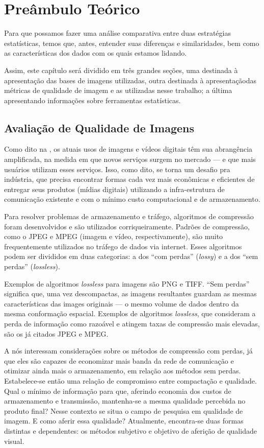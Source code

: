 \chapter{Preâmbulo Teórico}

Para que possamos fazer uma análise comparativa entre duas estratégias estatísticas, temos que, antes, entender suas diferenças e similaridades, bem como as características dos dados com os quais estamos lidando.

Assim, este capítulo será dividido em três grandes seções, uma destinada à apresentação das bases de imagens utilizadas, outra destinada à apresentaçãodas métricas de qualidade de imagem e as utilizadas nesse trabalho; a última apresentando informações sobre ferramentas estatísticas.

\section{Avaliação de Qualidade de Imagens}

Como dito na , os atuais usos de imagens e vídeos digitais têm sua abrangência amplificada, na medida em que novos serviços surgem no mercado --- e que mais usuários utilizam esses serviços. Isso, como dito, se torna um desafio pra indústria, que precisa encontrar formas cada vez mais econômicas e eficientes de entregar seus produtos (mídias digitais) utilizando a infra-estrutura de comunicação existente e com o mínimo custo computacional e de armazenamento.

Para resolver problemas de armazenamento e tráfego, algoritmos de compressão foram desenvolvidos e são utilizados corriqueiramente. Padrões de compressão, como o JPEG e MPEG (imagem e vídeo, respectivamente), são muito frequentemente utilizados no tráfego de dados via internet. Esses algoritmos podem ser divididos em duas categorias: a dos ``com perdas'' (\emph{lossy}) e a dos ``sem perdas'' (\emph{lossless}).

Exemplos de algoritmos \emph{lossless} para imagens são PNG e TIFF. ``Sem perdas'' significa que, uma vez descompactas, as imagens resultantes guardam as mesmas características das images originais --- o mesmo volume de dados dentro da mesma conformação espacial. Exemplos de algoritmos \emph{lossless}, que consideram a perda de informação como razoável e atingem taxas de compressão mais elevadas, são os já citados JPEG e MPEG.

A nós interessam considerações sobre os métodos de compressão com perdas, já que eles são capazes de economizar mais banda da rede de comunicação e otimizar ainda mais o armazenamento, em relação aos métodos sem perdas. Estabelece-se então uma relação de compromisso entre compactação e qualidade. Qual o mínimo de informação para que, aferindo economia dos custos de armazenamento e transmissão, mantenha-se a mesma qualidade percebida no produto final? Nesse contexto se situa o campo de pesquisa em qualidade de imagem. E como aferir essa qualidade? Atualmente, encontra-se duas formas distintas e dependentes: os métodos subjetivo e objetivo de aferição de qualidade visual.

